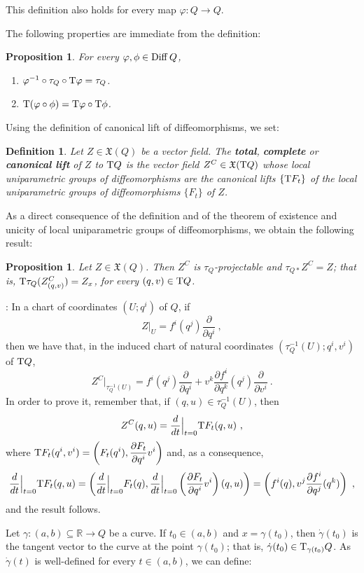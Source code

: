 \documentclass[12pt]{report}
\newtheorem{prop}[teor]{Proposition}
\newtheorem{definition}[teor]{Definition}
\def\ben{\begin{enumerate}}
\def\een{\end{enumerate}}
\def\dst{\displaystyle}
\def\derpar#1#2{\frac{\partial{#1}}{\partial{#2}}}
\def\vf{\mathfrak X}
\def\Real{\mathbb{R}}
\def\Tan{{\rm T}}
\begin{document}
\begin{appendix}
This definition also holds for every map $\varphi \colon Q\longrightarrow Q$.

The following properties are immediate from the definition:

\begin{prop}
For every $\varphi,\phi\in{\rm Diff}\,Q$,
\ben
\item
$\varphi^{-1}\circ\tau_Q\circ\Tan \varphi =\tau_Q$.
\item
$\Tan (\varphi\circ\phi )=\Tan\varphi\circ\Tan\phi$.
\een
\label{exerc1}
\end{prop}

Using the definition of canonical lift of diffeomorphisms, we set:

\begin{definition}
Let $Z\in\vf(Q)$ be a vector field.
The  \textbf{total}, \textbf{complete}  or \textbf{canonical lift} of $Z$ to $\Tan Q$
is the vector field $Z^C\in\vf (\Tan Q)$
whose local uniparametric groups of diffeomorphisms are the
canonical lifts $\{\Tan F_t\}$ of the
local uniparametric groups of diffeomorphisms
$\{F_t\}$ of $Z$.
\end{definition}

As a direct consequence of the definition and of the theorem of existence and unicity of local uniparametric groups of diffeomorphisms,
we obtain the following result:

\begin{prop}
Let $Z\in\vf (Q)$.
Then $Z^C$ is $\tau_Q$-projectable and $\tau_{Q*}Z^C=Z$;
that is, 
$\Tan\tau_Q(Z^C_{(q,v)})=Z_x$, for every $(q,v)\in\Tan Q$.
\label{prolevcan0}
\end{prop}

:
In a chart of coordinates $(U;q^i)$ of $Q$, if
$$
Z\vert_U=f^i(q^j)\derpar{}{q^i} \ ,
$$
then we have that, in the induced chart of natural coordinates $(\tau_Q^{-1}(U);q^i,v^i)$ of $\Tan Q$,
$$
Z^C\vert_{\tau_Q^{-1}(U)}=f^i(q^j)\derpar{}{q^i}+v^k\derpar{f^i}{q^k}(q^j)\derpar{}{v^i} \ .
$$
In order to prove it, remember that, if $(q,u)\in\tau_Q^{-1}(U)$, then
$$
Z^C(q,u)=\frac{d}{d t}\Big\vert_{t=0}\Tan F_t(q,u) \ ,
$$
where \(\dst\Tan F_t(q^i,v^i)=\left(F_t(q^i),\derpar{F_t}{q^i}v^i\right)\) and,
as a consequence,
$$
\frac{d}{d t}\Big\vert_{t=0}\Tan F_t(q,u)=
\left(\frac{d}{d t}\Big\vert_{t=0}F_t(q),
\frac{d}{d t}\Big\vert_{t=0}\left(\derpar{F_t}{q^i}v^i\right)(q,u)\right)=
\left(f^i(q),v^j\derpar{f^i}{q^j}(q^k)\right) \ ,
$$
and the result follows.

Let $\gamma\colon (a,b)\subseteq\Real\to Q$ be a curve.
If $t_0 \in (a,b)$ and $x=\gamma (t_0)$,
then $\dot\gamma (t_0)$ is the tangent vector to the curve
at the point $\gamma (t_0)$; that is,
$\dot\gamma (t_0)\in\Tan_{\gamma (t_0)}Q$.
As $\dot\gamma (t)$ is well-defined for every $t\in (a,b)$,
we can define:


\end{appendix}
\end{document}
